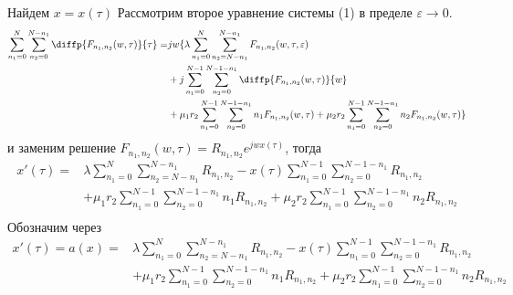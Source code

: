 Найдем $x=x(\tau)$ Рассмотрим второе уравнение системы (1) в пределе $\varepsilon \rightarrow 0$.
\begin{align*}
\sum_{n_1=0}^N\sum_{n_2=0}^{N-n_1} \diffp{F_{n_{1}, n_{2}}(w,\tau)}{\tau}=
&jw\{\lambda \sum_{n_1=0}^N\sum_{n_2=N-n_1}^{N-n_1} 
F_{n_{1}, n_{2}}(w,\tau, \varepsilon)\\
&+ j\sum_{n_1=0}^{N-1}\sum_{n_2=0}^{N-1-n_1} 
\diffp{F_{n_{1}, n_{2}}(w,\tau)}{w}\\
&+\mu_1 r_2 \sum_{n_1=0}^{N-1}\sum_{n_2=0}^{N-1-n_1} 
n_1 F_{n_{1}, n_{2}}(w,\tau)
+\mu_2 r_2 \sum_{n_1=0}^{N-1}\sum_{n_2=0}^{N-1-n_1} 
n_2 F_{n_{1}, n_{2}}(w,\tau)\}\\
\end{align*} 
и заменим решение $F_{n_{1}, n_{2}}(w,\tau)=R_{n_{1}, n_{2}}e^{jwx(\tau)}$, тогда
\begin{equation}
	\begin{aligned}
		x'(\tau) =
		&\lambda \sum_{n_1=0}^N\sum_{n_2=N-n_1}^{N-n_1} 
		R_{n_{1}, n_{2}}
		- x(\tau)\sum_{n_1=0}^{N-1}\sum_{n_2=0}^{N-1-n_1} 
		R_{n_{1}, n_{2}}\\
		&+\mu_1 r_2 \sum_{n_1=0}^{N-1}\sum_{n_2=0}^{N-1-n_1} 
		n_1 R_{n_{1}, n_{2}}
		+\mu_2 r_2 \sum_{n_1=0}^{N-1}\sum_{n_2=0}^{N-1-n_1} 
		n_2 R_{n_{1}, n_{2}}\\
	\end{aligned}
\end{equation}
Обозначим через
\begin{equation}
	\begin{aligned}
		x'(\tau)=a(x)=&\lambda \sum_{n_1=0}^N\sum_{n_2=N-n_1}^{N-n_1} 
		R_{n_{1}, n_{2}}
		- x(\tau)\sum_{n_1=0}^{N-1}\sum_{n_2=0}^{N-1-n_1} 
		R_{n_{1}, n_{2}}\\
		&+\mu_1 r_2 \sum_{n_1=0}^{N-1}\sum_{n_2=0}^{N-1-n_1} 
		n_1 R_{n_{1}, n_{2}}
		+\mu_2 r_2 \sum_{n_1=0}^{N-1}\sum_{n_2=0}^{N-1-n_1} 
		n_2 R_{n_{1}, n_{2}}
	\end{aligned}
\end{equation}
